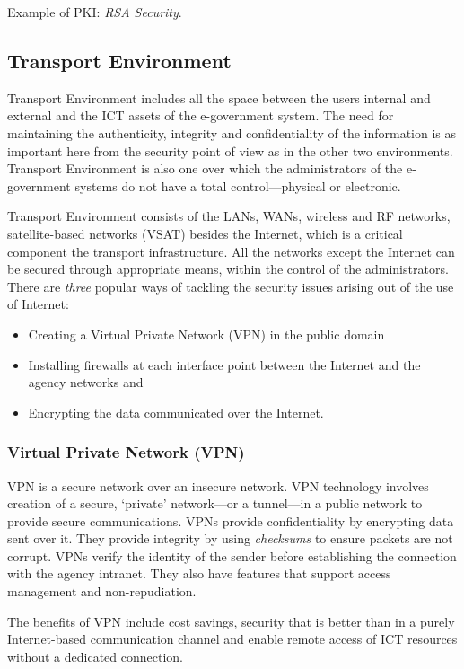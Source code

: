 Example of PKI: \textit{RSA Security}.

 \subsection{Transport Environment}
 Transport Environment includes all the space between the users internal and external and the ICT assets of the e-government system. The need for maintaining the authenticity, integrity and confidentiality of the information is as important here from the security point of view as in the other two environments. Transport Environment is also one over which the administrators of the e-government systems do not have a total control—physical or electronic.

 Transport Environment consists of the LANs, WANs, wireless and RF networks, satellite-based networks (VSAT) besides the Internet, which is a critical component the transport infrastructure. All the networks except the Internet can be secured through appropriate means, within the control of the administrators. There are \textit{three} popular ways of tackling the security issues arising out of the use of Internet:
 
 \begin{itemize}
 	\item Creating a Virtual Private Network (VPN) in the public domain
 	
 	\item Installing firewalls at each interface point between the Internet and the agency networks and
 	
 	\item Encrypting the data communicated over the Internet.
 \end{itemize}

\subsubsection*{Virtual Private Network (VPN)}
VPN is a secure network over an insecure network.
VPN technology involves creation of a secure, ‘private’ network—or a tunnel—in a public network to provide secure communications. VPNs provide confidentiality by
encrypting data sent over it. They provide integrity by using \textit{checksums} to ensure packets are not corrupt. VPNs verify the identity of the sender before establishing the connection with the agency intranet. They also have features that support access management and non-repudiation.

The benefits of VPN include cost savings, security that is better than in a purely
Internet-based communication channel and enable remote access of ICT resources without a dedicated connection.

